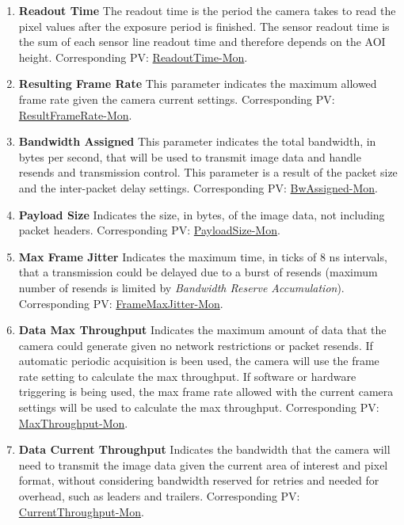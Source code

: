 \documentclass[openany]{article}
\begin{document}
        \begin{enumerate}
            \item \textbf{Readout Time} The readout time is the period the camera takes to read the pixel values after the exposure period is finished. The sensor readout time is the sum of each sensor line readout time and therefore depends on the AOI height. Corresponding PV: \hyperlink{pv:readout-time}{ReadoutTime-Mon}.
            \item \textbf{Resulting Frame Rate} This parameter indicates the maximum allowed frame rate given the camera current settings. Corresponding PV: \hyperlink{pv:result-frame-rate}{ResultFrameRate-Mon}.
            \item \textbf{Bandwidth Assigned} This parameter indicates the total bandwidth, in bytes per second, that will be used to transmit image data and handle resends and transmission control. This parameter is a result of the packet size and the inter-packet delay settings. Corresponding PV: \hyperlink{pv:bw-assigned}{BwAssigned-Mon}.
            \item \textbf{Payload Size} Indicates the size, in bytes, of the image data, not including packet headers. Corresponding PV: \hyperlink{pv:payload-size}{PayloadSize-Mon}.
            \item \textbf{Max Frame Jitter} Indicates the maximum time, in ticks of 8 ns intervals, that a transmission could be delayed due to a burst of resends (maximum number of resends is limited by \emph{Bandwidth Reserve Accumulation}). Corresponding PV: \hyperlink{pv:frame-max-jitter}{FrameMaxJitter-Mon}.
            \item \textbf{Data Max Throughput} Indicates the maximum amount of data that the camera could generate given no network restrictions or packet resends. If automatic periodic acquisition is been used, the camera will use the frame rate setting to calculate the max throughput. If software or hardware triggering is being used, the max frame rate allowed with the current camera settings will be used to calculate the max throughput. Corresponding PV: \hyperlink{pv:max-throughput}{MaxThroughput-Mon}.
            \item \textbf{Data Current Throughput} Indicates the bandwidth that the camera will need to transmit the image data given the current area of interest and pixel format, without considering bandwidth reserved for retries and needed for overhead, such as leaders and trailers. Corresponding PV: \hyperlink{pv:current-throughput}{CurrentThroughput-Mon}.

\end{enumerate}
\end{document}
